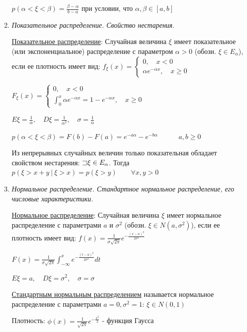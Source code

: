 \documentclass[12pt]{article}
\begin{document}
\begin{enumerate}
    $p(\alpha < \xi < \beta) = \frac{\beta - \alpha}{b - a}$ при условии, что $\alpha, \beta \in [a, b]$

    \item \textit{Показательное распределение. Свойство нестарения.}

    \hyperlink{exponentialdistribution}{Показательное распределение}: Случайная величина $\xi$ имеет показательное (или экспоненциальное) распределение с параметром $\alpha > 0$ (обозн. $\xi \in E_\alpha$),
    если ее плотность имеет вид: $f_\xi(x) = \begin{cases}0, \quad x < 0 \\ \alpha e^{-\alpha x}, \quad x \geq 0\end{cases}$

    $F_\xi(x) = \begin{cases}0, \quad x < 0 \\ \int_0^x \alpha e^{-\alpha x} = 1 - e^{-\alpha x}, \quad x \geq 0\end{cases}$

    $E\xi = \frac{1}{\alpha}, \quad D\xi = \frac{1}{\alpha^2}, \quad \sigma = \frac{1}{\alpha}$

    $p(\alpha < \xi < \beta) = F(b) - F(a) = e^{-a\alpha} - e^{-b\alpha} \quad\quad\quad a, b \geq 0$

    Из непрерывных случайных величин только показательная обладает свойством нестарения:
    \Ths $\mathord{\sqsupset} \xi \in E_\alpha$. Тогда $p(\xi > x + y \ | \ \xi > x) = p(\xi > y) \quad\quad \forall x, y > 0$

    \item \textit{Нормальное распределение. Стандартное нормальное распределение, его числовые характеристики.}

    \hyperlink{normaldistribution}{Нормальное распределение}: Случайная величина $\xi$ имеет нормальное распределение с параметрами $a$ и $\sigma^2$ (обозн. $\xi \in N(a, \sigma^2)$), если
    ее плотность имеет вид: $f(x) = \frac{1}{\sigma \sqrt{2\pi}} e^{-\frac{(x - a)^2}{2\sigma^2}}$

    $F(x) = \frac{1}{\sigma \sqrt{2\pi}} \int_{-\infty}^x e^{-\frac{(t - a)^2}{2\sigma^2}} dt$

    $E\xi = a, \quad D\xi = \sigma^2, \quad \sigma = \sigma$

    \hyperlink{standardnormaldistribution}{Стандартным нормальным распределением} называется нормальное распределение с параметрами $a = 0, \sigma^2 = 1$: $\xi \in N(0, 1)$

    Плотность: $\phi(x) = \frac{1}{\sqrt{2\pi}} e^{-\frac{x^2}{2}}$ - функция Гаусса


\end{enumerate}
\end{document}
